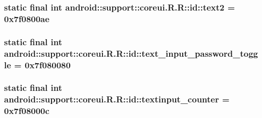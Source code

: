 \hypertarget{classandroid_1_1support_1_1coreui_1_1_r_1_1id_5381a5ad09cf0ab6ce7daee6a275c277}{
\subsubsection[{text2}]{\setlength{\rightskip}{0pt plus 5cm}static final int android::support::coreui.R.R::id::text2 = 0x7f0800ae}}
\label{classandroid_1_1support_1_1coreui_1_1_r_1_1id_5381a5ad09cf0ab6ce7daee6a275c277}


\hypertarget{classandroid_1_1support_1_1coreui_1_1_r_1_1id_128be11b2370a65a2c501be63a7a3e66}{
\subsubsection[{text\_\-input\_\-password\_\-toggle}]{\setlength{\rightskip}{0pt plus 5cm}static final int android::support::coreui.R.R::id::text\_\-input\_\-password\_\-toggle = 0x7f080080}}
\label{classandroid_1_1support_1_1coreui_1_1_r_1_1id_128be11b2370a65a2c501be63a7a3e66}


\hypertarget{classandroid_1_1support_1_1coreui_1_1_r_1_1id_d10a9e58413b82800d342145683d81e0}{
\subsubsection[{textinput\_\-counter}]{\setlength{\rightskip}{0pt plus 5cm}static final int android::support::coreui.R.R::id::textinput\_\-counter = 0x7f08000c}}
\label{classandroid_1_1support_1_1coreui_1_1_r_1_1id_d10a9e58413b82800d342145683d81e0}


